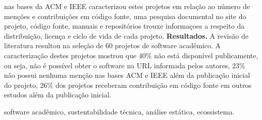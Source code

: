 \documentclass[msc, classic, a4paper]{ufbathesis}
\begin{document}
nas bases da ACM e IEEE caracterizou estes projetos em relação ao número de
menções e contribuições em código fonte, uma pesquisa documental no site do projeto,
código fonte, manuais e repositórios trouxe informaçoes a respeito da
distribuição, licença e ciclo de vida de cada projeto.
%
\textbf{Resultados.}
A revisão de literatura resultou na seleção de 60
projetos de software acadêmico. %
%
A caracterização destes projetos mostrou que 40\% não está disponível
publicamente, ou seja, não é possível obter o software na URL informada pelos
autores,
%
23\% não possui nenhuma menção nas bases
ACM e IEEE além da publicação inicial do projeto,
26\% dos projetos receberam contribuição em código fonte em outros estudos
além da publicação inicial.
%
%

\begin{keywords}

software acadêmico, sustentabilidade técnica, análise estática, ecossistema.

\end{keywords}

\tableofcontents
\listoffigures
\listoftables

\mainmatter






\end{document}
